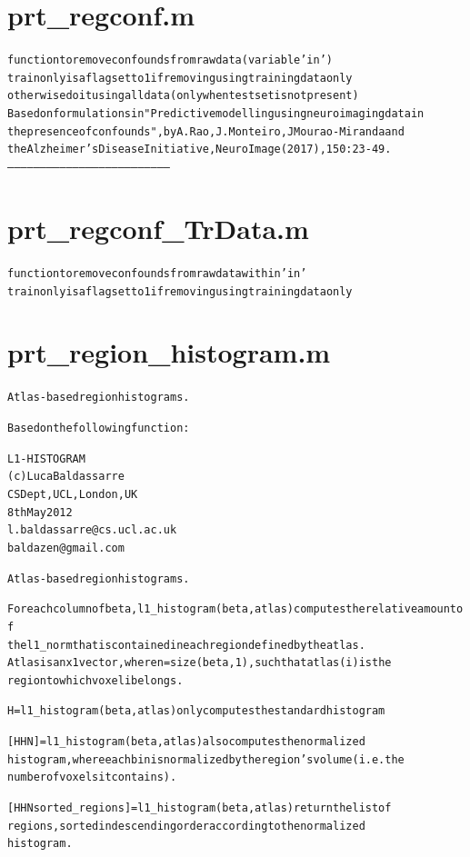 \section{prt\_regconf.m}
\begin{alltt}

 function to remove confounds from raw data (variable 'in')
 trainonly is a flag set to 1 if removing using training data only
 otherwise do it using all data (only when test set is not present)
 Based on formulations in "Predictive modelling using neuroimaging data in
 the presence of confounds", by A. Rao, J. Monteiro, J Mourao-Miranda and
 the Alzheimer's Disease Initiative, NeuroImage (2017), 150:23-49.
--------------------------------------------------------------------------
\end{alltt}


\section{prt\_regconf\_TrData.m}
\begin{alltt}

 function to remove confounds from raw data within 'in'
 trainonly is a flag set to 1 if removing using training data only
\end{alltt}


\section{prt\_region\_histogram.m}
\begin{alltt}

 
 Atlas-based region histograms.
 
 Based on the following function:
 
 L1-HISTOGRAM
 (c) Luca Baldassarre
 CS Dept, UCL, London, UK
 8th May 2012
 l.baldassarre@cs.ucl.ac.uk
 baldazen@gmail.com
 
 Atlas-based region histograms.
 
 For each column of beta, l1\_histogram(beta, atlas) computes the relative amount of
 the l1\_norm that is contained in each region defined by the atlas.
 Atlas is a nx1 vector, where n = size(beta,1), such that atlas(i) is the
 region to which voxel i belongs.
 
 H = l1\_histogram(beta, atlas) only computes the standard histogram
 
 [H HN] = l1\_histogram(beta, atlas) also computes the normalized
 histogram, where each bin is normalized by the region's volume (i.e. the
 number of voxels it contains).
 
 [H HN sorted\_regions] = l1\_histogram(beta, atlas) return the list of
 regions, sorted in descending order according to the normalized
 histogram.
\end{alltt}


